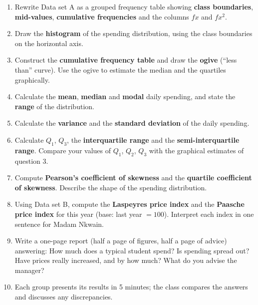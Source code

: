 \documentclass[11pt]{article}
\begin{document}
\begin{enumerate}
\item Rewrite Data set A as a grouped frequency table showing \textbf{class boundaries}, \textbf{mid-values}, \textbf{cumulative frequencies} and the columns $fx$ and $fx^2$.
\item Draw the \textbf{histogram} of the spending distribution, using the class boundaries on the horizontal axis.
\item Construct the \textbf{cumulative frequency table} and draw the \textbf{ogive} (``less than'' curve). Use the ogive to estimate the median and the quartiles graphically.
\item Calculate the \textbf{mean}, \textbf{median} and \textbf{modal} daily spending, and state the \textbf{range} of the distribution.
\item Calculate the \textbf{variance} and the \textbf{standard deviation} of the daily spending.
\item Calculate $Q_1$, $Q_3$, the \textbf{interquartile range} and the \textbf{semi-interquartile range}. Compare your values of $Q_1$, $Q_2$, $Q_3$ with the graphical estimates of question 3.
\item Compute \textbf{Pearson's coefficient of skewness} and the \textbf{quartile coefficient of skewness}. Describe the shape of the spending distribution.
\item Using Data set B, compute the \textbf{Laspeyres price index} and the \textbf{Paasche price index} for this year (base: last year $= 100$). Interpret each index in one sentence for Madam Nkwain.
\item Write a one-page report (half a page of figures, half a page of advice) answering: How much does a typical student spend? Is spending spread out? Have prices really increased, and by how much? What do you advise the manager?
\item Each group presents its results in 5 minutes; the class compares the answers and discusses any discrepancies.
\end{enumerate}
\end{document}
